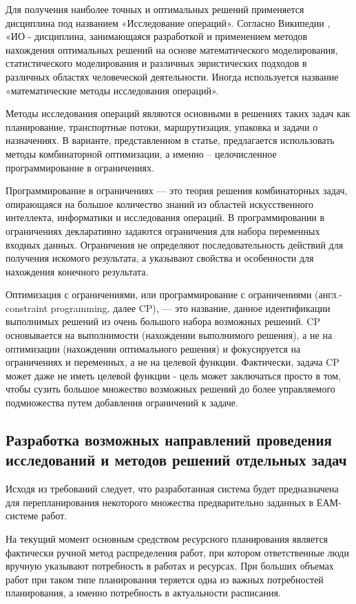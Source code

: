 Для получения наиболее точных и оптимальных решений применяется дисциплина под названием «Исследование операций». Согласно Википедии \cite{wikicp}, «ИО - дисциплина, занимающаяся разработкой и применением методов нахождения оптимальных решений на основе математического моделирования, статистического моделирования и различных эвристических подходов в различных областях человеческой деятельности. Иногда используется название «математические методы исследования операций».

Методы исследования операций являются основными в решениях таких задач как планирование, транспортные потоки, маршрутизация, упаковка и задачи о назначениях. В варианте, представленном в статье, предлагается использовать методы комбинаторной оптимизации, а именно – целочисленное программирование в ограничениях.

Программирование в ограничениях — это теория решения комбинаторных задач, опирающаяся на большое количество знаний из областей искусственного интеллекта, информатики и исследования операций. В программировании в ограничениях декларативно задаются ограничения для набора переменных входных данных. Ограничения не определяют последовательность действий для получения искомого результата, а указывают свойства и особенности для нахождения конечного результата. 

Оптимизация с ограничениями, или программирование с ограничениями (англ.- constraint programming, далее CP), — это название, данное идентификации выполнимых решений из очень большого набора возможных решений. CP основывается на выполнимости (нахождении выполнимого решения), а не на оптимизации (нахождении оптимального решения) и фокусируется на ограничениях и переменных, а не на целевой функции. Фактически, задача CP может даже не иметь целевой функции - цель может заключаться просто в том, чтобы сузить большое множество возможных решений до более управляемого подмножества путем добавления ограничений к задаче.

\subsection{Разработка возможных направлений проведения исследований и методов решений отдельных задач}

Исходя из требований следует, что разработанная система будет предназначена для перепланирования некоторого множества предварительно заданных в ЕАМ-системе работ.

На текущий момент основным средством ресурсного планирования является фактически ручной метод распределения работ, при котором ответственные люди вручную указывают потребность в работах и ресурсах. При больших объемах работ при таком типе планирования теряется одна из важных потребностей планирования, а именно потребность в актуальности расписания.

